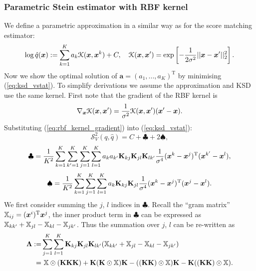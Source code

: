 \subsubsection{Parametric Stein estimator with RBF kernel}
We define a parametric approximation in a similar way as for the score matching estimator:
\begin{equation}
\log \hat{q}(\bm{x}) := \sum_{k=1}^K a_k \mathcal{K}(\bm{x}, \bm{x}^k) + C, \quad \mathcal{K}(\bm{x}, \bm{x}') = \exp \left[-\frac{1}{2\sigma^2} ||\bm{x} - \bm{x}' ||_2^2  \right].
\end{equation}
Now we show the optimal solution of $\bm{a} = (a_1, ..., a_K)^{\text{T}}$ by minimising (\ref{eq:ksd_vstat}). 
To simplify derivations we assume the approximation and KSD use the same kernel. First note that the gradient of the RBF kernel is
\begin{equation}
\nabla_{\bm{x}} \mathcal{K}(\bm{x}, \bm{x}') = \frac{1}{\sigma^2} \mathcal{K}(\bm{x}, \bm{x}') (\bm{x}' - \bm{x}).
\label{eq:rbf_kernel_gradient}
\end{equation}
%
Substituting (\ref{eq:rbf_kernel_gradient}) into (\ref{eq:ksd_vstat}):
\begin{equation*}
\mathcal{S}_{V}^2(q, \hat{q}) = C + \clubsuit + 2 \spadesuit,
\end{equation*}
\begin{equation*}
\clubsuit = \frac{1}{K^2} \sum_{k=1}^K \sum_{k'=1}^K \sum_{j=1}^K \sum_{l=1}^K a_k a_{k'} \mathbf{K}_{kj} \mathbf{K}_{jl} \mathbf{K}_{lk'} \frac{1}{\sigma^4} (\bm{x}^k - \bm{x}^j)^{\text{T}}(\bm{x}^{k'} - \bm{x}^l),
\end{equation*}
\begin{equation*}
\spadesuit = \frac{1}{K^2} \sum_{k=1}^K \sum_{j=1}^K \sum_{l=1}^K a_k \mathbf{K}_{kj} \mathbf{K}_{jl} \frac{1}{\sigma^4} (\bm{x}^k - \bm{x}^j)^{\text{T}} (\bm{x}^j - \bm{x}^l).
\end{equation*}
We first consider summing the $j$, $l$ indices in $\clubsuit$. Recall the ``gram matrix'' $\mathbb{X}_{ij} = (\bm{x}^i)^{\text{T}} \bm{x}^j$, the inner product term in $\clubsuit$ can be expressed as $\mathbb{X}_{kk'} + \mathbb{X}_{jl} - \mathbb{X}_{kl} - \mathbb{X}_{jk'}$. Thus the summation over $j$, $l$ can be re-written as
\begin{equation*}
\begin{aligned}
\bm{\Lambda} :=& \sum_{j=1}^K \sum_{l=1}^K \mathbf{K}_{kj} \mathbf{K}_{jl} \mathbf{K}_{lk'} (\mathbb{X}_{kk'} + \mathbb{X}_{jl} - \mathbb{X}_{kl} - \mathbb{X}_{jk'}) \\
=& \  \mathbb{X} \odot (\mathbf{K} \mathbf{K} \mathbf{K}) + \mathbf{K} (\mathbf{K} \odot \mathbb{X}) \mathbf{K} - ((\mathbf{K}\mathbf{K}) \odot \mathbb{X}) \mathbf{K} - \mathbf{K} ((\mathbf{K}\mathbf{K}) \odot \mathbb{X}).
\end{aligned}
\end{equation*}
